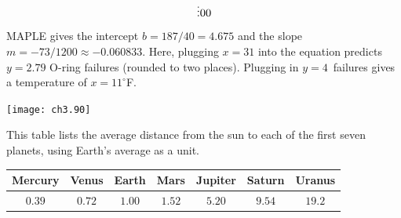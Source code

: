 \begin{exercises}
\begin{answer}
\begin{exparts}
\begin{equation*}
{%
                     \vdots \\
                     0 \\
                     0}
          \end{equation*}
          MAPLE gives the intercept $b=187/40=4.675$ and the 
          slope $m=-73/1200\approx -0.060833$.
          Here, plugging $x=31$ into the equation predicts 
          $y=2.79$ O-ring failures (rounded to two places).
          Plugging in $y=4$~failures gives a temperature of 
          $x=11^\circ$F.
     \begin{center}  \small
       \texttt{[image: ch3.90]}
      \end{center}
      \end{exparts}  
    \end{answer}
  \item 
     This table lists the average distance from the sun to
     each of the first seven planets, using Earth's average as a unit.
     \begin{center}
       \begin{tabular}{ccccccc}
         Mercury &Venus   &Earth   &Mars    &Jupiter &Saturn  &Uranus  \\ 
         \hline     
         $0.39$  &$0.72$  &$1.00$  &$1.52$  &$5.20$  &$9.54$  &$19.2$
       \end{tabular}
     \end{center}
    \begin{exparts}

\end{exparts}
\end{exercises}
